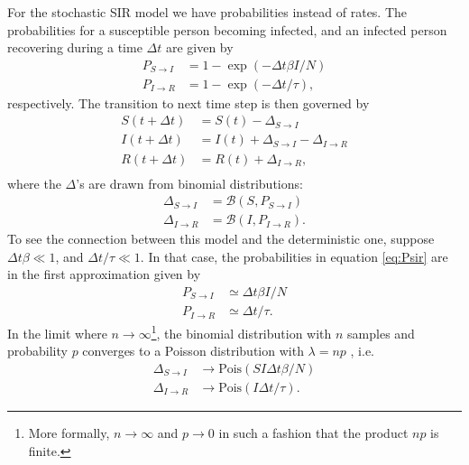For the stochastic SIR model we have probabilities instead of rates. The probabilities for a susceptible person becoming infected, and an infected person recovering during a time $\Delta t$ are given by
\begin{subequations}\label{eq:Psir}
	\begin{align}
		P_{S\to I} &= 1- \exp{(-\Delta t \beta I /N)} \\
		P_{I\to R} &= 1- \exp{(-\Delta t /\tau)},
	\end{align}
\end{subequations}
respectively. The transition to next time step is then governed by 
\begin{subequations}\label{eq:sir_disc}
	\begin{align}
		S(t + \Delta t) &= S(t) - \Delta_{S\to I} \\
		I(t + \Delta t) &= I(t) + \Delta_{S\to I} - \Delta_{I\to R} \\
		R(t + \Delta t) &= R(t) + \Delta_{I \to R}, \\
	\end{align}
\end{subequations}
where the $\Delta$'s are drawn from binomial distributions:
\begin{subequations}
	\begin{align*}
		\Delta_{S\to I } &= \mathcal{B}(S,P_{S \to I}) \\
		\Delta_{I\to R } &= \mathcal{B}(I,P_{I \to R}).
	\end{align*}
\end{subequations}
To see the connection between this model and the deterministic one, suppose $\Delta t  \beta \ll 1$, and $\Delta t/\tau \ll 1$. In that case, the probabilities in equation \eqref{eq:Psir} are in the first approximation given by
\begin{subequations}
	\begin{align}
		P_{S\to I} &\simeq \Delta t \beta I/N \\
		P_{I\to R} &\simeq \Delta t/\tau. 
	\end{align}
\end{subequations}
In the limit where $n\to \infty$\footnote{More formally, $n\to \infty$ and $p\to 0$ in such a fashion that the product $np$ is finite. }, the binomial distribution with $n$ samples and probability $p$ converges to a Poisson distribution with $\lambda = np$ \cite{Wassermann}, i.e. 
\begin{subequations}
	\begin{align}
		\Delta_{S\to I} &\to \mathrm{Pois}(SI \Delta t \beta/N) \\
		\Delta_{I\to R} &\to \mathrm{Pois}(I \Delta t/\tau).
	\end{align}
\end{subequations}
